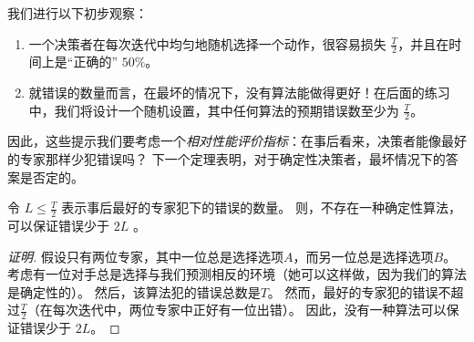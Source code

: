 我们进行以下初步观察：
\begin{enumerate} 
\paragraph{
    简单的观测：
    }
\item
一个决策者在每次迭代中均匀地随机选择一个动作，很容易损失 $\frac{T}{2}$，并且在时间上是“正确的” $50\%$。
\item
就错误的数量而言，在最坏的情况下，没有算法能做得更好！在后面的练习中，我们将设计一个随机设置，其中任何算法的预期错误数至少为 $\frac{T}{2}$。
\end{enumerate}

因此，这些提示我们要考虑一个{\it 相对性能评价指标}：在事后看来，决策者能像最好的专家那样少犯错误吗？
下一个定理表明，对于确定性决策者，最坏情况下的答案是否定的。
\begin{theorem}
令  $L \leq \frac{T} {2} $ 表示事后最好的专家犯下的错误的数量。
则，不存在一种确定性算法，可以保证错误少于 $2L$ 。
\end{theorem}

\begin{proof}[证明]

假设只有两位专家，其中一位总是选择选项$A$，而另一位总是选择选项$B$。
考虑有一位对手总是选择与我们预测相反的环境（她可以这样做，因为我们的算法是确定性的）。
然后，该算法犯的错误总数是$T$。
然而，最好的专家犯的错误不超过$\frac{T}{2}$（在每次迭代中，两位专家中正好有一位出错）。
因此，没有一种算法可以保证错误少于 $2L$。
\end{proof}

